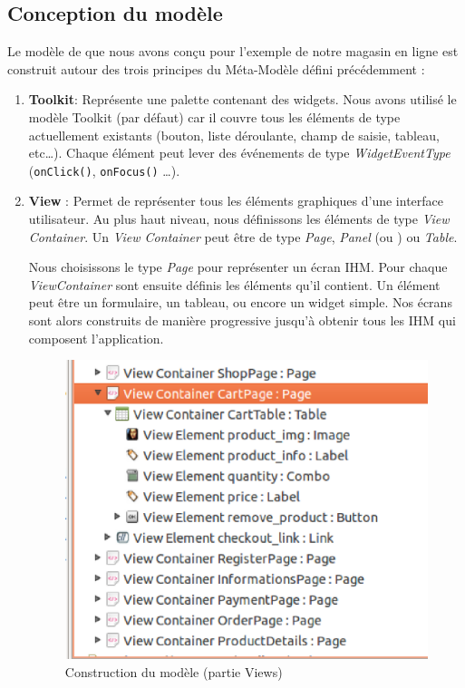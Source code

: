 \subsection{Conception du modèle}
Le modèle de \kwcinematic que nous avons conçu pour l'exemple de notre magasin en ligne est construit autour des trois principes du Méta-Modèle défini précédemment :
\begin{enumerate}
\item \textbf{Toolkit}: Représente une palette contenant des widgets. Nous avons utilisé le modèle Toolkit (par défaut) car il couvre tous les éléments de type   actuellement existants (bouton, liste déroulante, champ de saisie, tableau, etc\dots). Chaque élément  peut lever des événements de type \textit{WidgetEventType} (\verb+onClick()+, \verb+onFocus()+ \dots). 

\item \textbf{View} : Permet de représenter tous les éléments graphiques d'une interface utilisateur. Au plus haut niveau, nous définissons les éléments de type \textit{View Container}. Un \textit{View Container} peut être de type \textit{Page}, \textit{Panel} (ou ) ou \textit{Table}. 

Nous choisissons le type \textit{Page} pour représenter un écran \textsc{IHM}. Pour chaque \textit{ViewContainer} sont ensuite définis les éléments qu'il contient. Un élément peut être un formulaire, un tableau, ou encore un widget simple. Nos écrans sont alors construits de manière progressive jusqu'à obtenir tous les  \textsc{IHM} qui composent l'application.
\begin{figure}[H]
  \centering
  \includegraphics[scale=.4]{img/views.eps}
  \caption{Construction du modèle (partie Views)}
  \label{fig:view}
\end{figure}


\end{enumerate}
